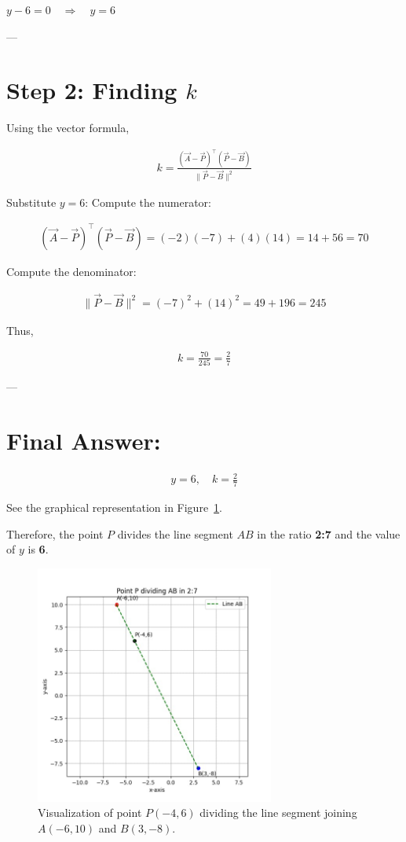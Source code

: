 \documentclass[14pt, a4paper]{extarticle}
\begin{document}
$
y - 6 = 0 \quad \Rightarrow \quad y = 6
$

---

\section*{Step 2: Finding \(k\)}

Using the vector formula,

\begin{align}
k = \frac{(\vec{A} - \vec{P})^\top(\vec{P} - \vec{B})}{\|\vec{P} - \vec{B}\|^2}
\end{align}

\noindent
Substitute $y = 6$:
Compute the numerator:

\begin{align}
(\vec{A}-\vec{P})^\top (\vec{P}-\vec{B}) = (-2)(-7) + (4)(14) = 14 + 56 = 70
\end{align}

\noindent
Compute the denominator:

\begin{align}
\|\vec{P}-\vec{B}\|^2 = (-7)^2 + (14)^2 = 49 + 196 = 245
\end{align}

\noindent
Thus,

\begin{align}
k = \frac{70}{245} = \frac{2}{7}
\end{align}

---

\section*{Final Answer:}

\begin{align}
\boxed{y = 6, \quad k = \frac{2}{7}}
\end{align}


See the graphical representation in Figure~\ref{fig:line_division}.

\vspace{1cm} %

\noindent Therefore, the point $P$ divides the line segment $AB$ in the ratio \textbf{2:7} and the value of $y$ is \textbf{6}.

\begin{figure}[h!]
    \centering
    \includegraphics[width=0.7\textwidth]{figs/fig.jpg}
    \caption{Visualization of point $P(-4, 6)$ dividing the line segment joining $A(-6, 10)$ and $B(3, -8)$.}
    \label{fig:line_division}
\end{figure}
\end{document}
